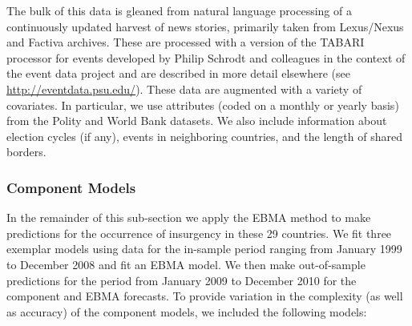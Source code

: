 \documentclass[pdftex,12pt,fullpage,oneside]{amsart}
\begin{document}

The bulk of this data is gleaned from natural language processing of a
continuously updated harvest of news stories, primarily taken from
Lexus/Nexus and Factiva archives. These are processed with a version
of the TABARI processor for events developed by Philip Schrodt and
colleagues in the context of the event data project and are described
in more detail elsewhere (see \url{http://eventdata.psu.edu/}).  These
data are augmented with a variety of covariates. In particular, we use
attributes (coded on a monthly or yearly basis) from the Polity and
World Bank datasets. We also include information about election cycles
(if any), events in neighboring countries, and the length of shared
borders.

\subsubsection{Component Models}

In the remainder of this sub-section we apply the EBMA method to make
predictions for the occurrence of insurgency in these 29 countries.
We fit three exemplar models using data for the in-sample period
ranging from January 1999 to December 2008 and fit an EBMA model.  We
then make out-of-sample predictions for the period from January 2009 to
December 2010 for the component and EBMA forecasts.  To
provide variation in the complexity (as well as accuracy) of the
component models, we included the following models:
\end{document}
